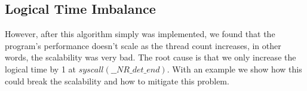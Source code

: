 \documentclass{sig-alternate}
\begin{document}
\subsection{Logical Time Imbalance}
However, after this algorithm simply was implemented, we found that the program's performance doesn't scale as the thread count increases, in other words, the scalability was very bad. The root cause is that we only increase the logical time by 1 at $syscall(\_\_NR\_det\_end)$. With an example we show how this could break the scalability and how to mitigate this problem.




\end{document}
